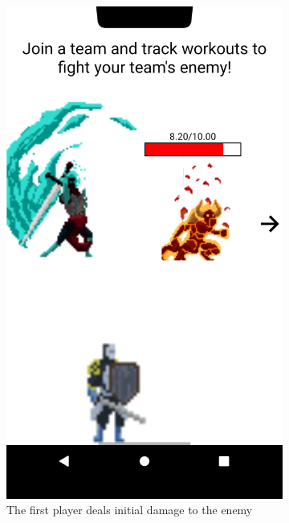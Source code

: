 \documentclass{l4proj}
\begin{document}
\begin{figure}[H]
    \begin{subfigure}{0.45\textwidth}
      \includegraphics[width=\textwidth]{upper_attack.png}    
      \caption{The first player deals initial damage to the enemy}
    \end{subfigure}
    \begin{subfigure}{0.45\textwidth}

\end{subfigure}
\end{figure}
\end{document}
